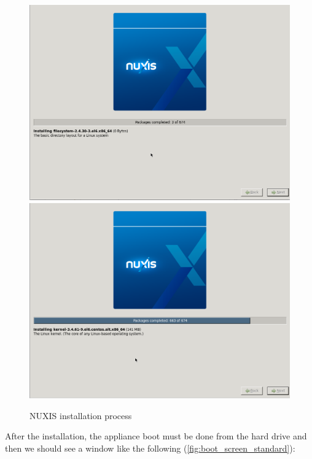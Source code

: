 \begin{figure}[H]
\begin{center}
	\includegraphics[scale=0.2]{screenshots/install/unitbox/progress_install_01.png}
	\includegraphics[scale=0.2]{screenshots/install/unitbox/progress_install_02.png}
    \caption{NUXIS installation process}
	\label{fig:installation_standard}
	\end{center}
\end{figure}

After the installation, the appliance boot must be done from the hard drive and then we should see a window like the following (\ref{fig:boot_screen_standard}):

